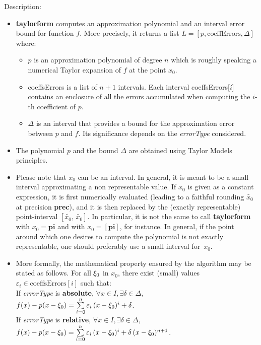 \noindent Description: \begin{itemize}

\item \textbf{taylorform} computes an approximation polynomial and an interval error bound
   for function $f$. More precisely, it returns a list $L = \left[p, \textrm{coeffErrors},\Delta \right]$
   where:
   \begin{itemize}
   \item $p$ is an approximation polynomial of degree $n$ which is roughly speaking
   a numerical Taylor expansion of $f$ at the point $x_0$.
   \item coeffsErrors is a list of $n+1$ intervals. Each interval coeffsErrors[$i$]
   contains an enclosure of all the errors accumulated when computing the $i$-th
   coefficient of $p$.
   \item $\Delta$ is an interval that provides a bound for the approximation error
   between $p$ and $f$. Its significance depends on the \emph{errorType} considered.
   \end{itemize}

\item The polynomial $p$ and the bound  $\Delta$ are obtained using Taylor Models
   principles.

\item Please note that $x_0$ can be an interval. In general, it is meant to be a
   small interval approximating a non representable value. If $x_0$ is given as a
   constant expression, it is first numerically evaluated (leading to a faithful
   rounding $\tilde{x_0}$ at precision \textbf{prec}), and it is then replaced by the (exactly
   representable) point-interval $[\tilde{x_0},\,\tilde{x_0}]$. In particular, it is not
   the same to call \textbf{taylorform} with $x_0 = \textbf{pi}$ and with $x_0 = [\textbf{pi}]$, for instance.
   In general, if the point around which one desires to compute the polynomial
   is not exactly representable, one should preferably use a small interval
   for~$x_0$.

\item More formally, the mathematical property ensured by the algorithm may be
   stated as follows. For all $\xi_0$ in $x_0$, there exist (small) values
   $\varepsilon_i \in \textrm{coeffsErrors}[i]$ such that:
   \\
   If \emph{errorType} is \textbf{absolute}, $\forall x \in I, \exists \delta \in \Delta,\,$
   $f(x)-p(x-\xi_0) = \sum\limits_{i=0}^{n} \varepsilon_i\, (x-\xi_0)^i + \delta$.
   \\
   If \emph{errorType} is \textbf{relative}, $\forall x \in I, \exists \delta \in \Delta,\,$
   $f(x)-p(x-\xi_0) = \sum\limits_{i=0}^{n} \varepsilon_i\, (x-\xi_0)^i + \delta\,(x-\xi_0)^{n+1}$.


\end{itemize}
